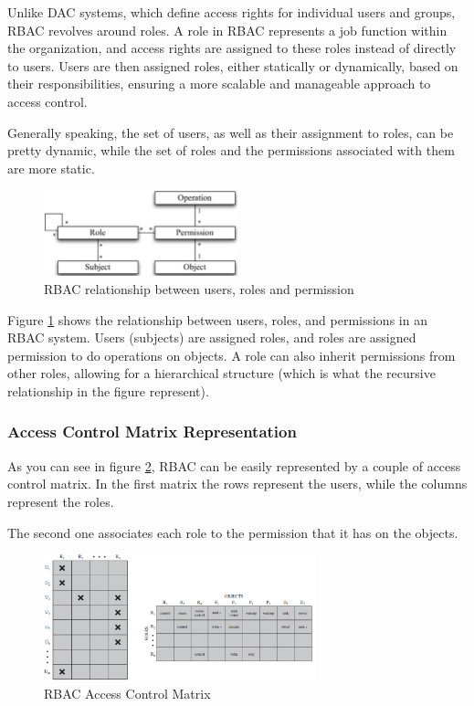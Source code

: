 Unlike DAC systems, which define access rights for individual users
and groups, RBAC revolves around roles. A role in RBAC represents a
job function within the organization, and access rights are assigned
to these roles instead of directly to users. Users are then assigned
roles, either statically or dynamically, based on their
responsibilities, ensuring a more scalable and manageable approach to
access control.

Generally speaking, the set of users, as well as their assignment to
roles, can be pretty dynamic, while the set of roles and the 
permissions associated with them are more static.

\begin{figure}[H]
  \centering
  \includegraphics[width=0.5\textwidth]{img/rbac schema.png}
  \caption{RBAC relationship between users, roles and permission}
  \label{fig:rbac}
\end{figure}

Figure \ref{fig:rbac} shows the relationship between users, roles, and
permissions in an RBAC system. Users (subjects) are assigned roles,
and roles are assigned permission to do operations on objects. A role
can also inherit permissions from other roles, allowing for a
hierarchical structure (which is what the recursive relationship in
the figure represent).

\subsubsection{Access Control Matrix Representation}
As you can see in figure \ref{fig:rbac-matrix}, RBAC can be easily
represented by a couple of access control matrix. In the first matrix
the rows represent the users, while the columns represent the roles.

The second one associates each role to the permission that it has on
the objects.

\begin{figure}[H]
  \centering
  \includegraphics[width=0.7\textwidth]{img/rbac matrix.png}
  \caption{RBAC Access Control Matrix}
  \label{fig:rbac-matrix}
\end{figure}

